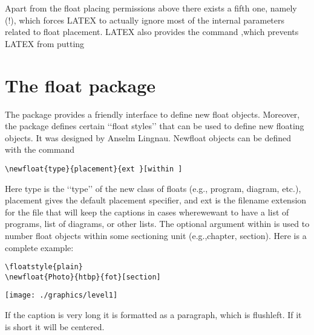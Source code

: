Apart from the float placing permissions above there exists a fifth one, namely (!), which
forces LATEX to actually ignore most of the internal parameters related to float placement.
LATEX also provides the command ,which prevents LATEX from putting


\section{The float package}

The  package provides a friendly interface to define new float objects. Moreover, the package
defines certain ‘‘float styles’’ that can be used to define new floating objects.  It
was designed by Anselm Lingnau. Newfloat objects can be defined with the command

\begin{verbatim}
\newfloat{type}{placement}{ext }[within ]
\end{verbatim}



Here type is the ‘‘type’’ of the new class of floats (e.g., program, diagram, etc.),
placement gives the default placement specifier, and ext is the filename extension
for the file that will keep the captions in cases wherewewant to have a list of programs,
list of diagrams, or other lists. The optional argument within is used to number float
objects within some sectioning unit (e.g.,chapter, section). Here is a complete example:

\begin{lstlisting}[language={[common]TeX},% 
                           alsolanguage={[LaTeX]TeX},% 
                           alsolanguage={[primitive]TeX},%
                           alsolanguage={Verse}]
\floatstyle{plain}
\newfloat{Photo}{htbp}{fot}[section]
\end{lstlisting}



\makeatletter
\newcommand\fs@framed{\def\@fs@cfont{\bfseries}\let\@fs@capt\floatc@ruled
\def\@fs@pre{\hrule height.8pt depth0pt \kern2pt}%
 \def\@fs@post{\kern3pt\hrule\relax}%
 \def\@fs@mid{\kern2pt\hrule\kern2pt}%
 \let\@fs@iftopcapt\iftrue}
\makeatother



\begin{Photo}
 \centering
 \texttt{[image: ./graphics/level1]}
\caption[a short caption]{If the caption is very long it is formatted as a paragraph, which is flushleft. If it is short it will be centered. }
\end{Photo}


